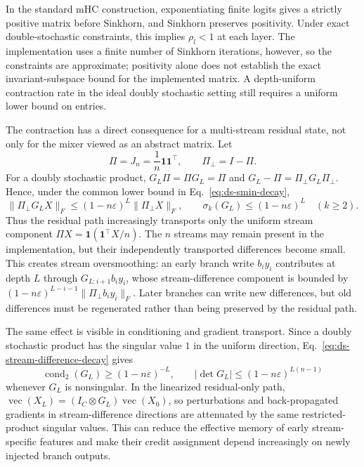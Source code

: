 \documentclass{article}
\begin{document}
In the standard mHC construction, exponentiating finite logits gives a strictly positive matrix before Sinkhorn, and Sinkhorn preserves positivity. Under exact double-stochastic constraints, this implies $\rho_l<1$ at each layer. The implementation uses a finite number of Sinkhorn iterations, however, so the constraints are approximate; positivity alone does not establish the exact invariant-subspace bound for the implemented matrix. A depth-uniform contraction rate in the ideal doubly stochastic setting still requires a uniform lower bound on entries.



The contraction has a direct consequence for a multi-stream residual state, not only for the mixer viewed as an abstract matrix. Let
\begin{equation}
 \Pi=J_n=\frac{1}{n}\mathbf 1\mathbf 1^\top,
 \qquad \Pi_\perp=I-\Pi.
 \label{eq:ds-projectors-main}
\end{equation}
For a doubly stochastic product, $G_L\Pi=\Pi G_L=\Pi$ and
$G_L-\Pi=\Pi_\perp G_L\Pi_\perp$. Hence, under the common lower bound in
Eq.~\ref{eq:ds-smin-decay},
\begin{equation}
 \|\Pi_\perp G_LX\|_F
 \leq (1-n\varepsilon)^L\|\Pi_\perp X\|_F,
 \qquad
 \sigma_k(G_L)\leq(1-n\varepsilon)^L\quad (k\geq2).
 \label{eq:ds-stream-difference-decay}
\end{equation}
Thus the residual path increasingly transports only the uniform stream component
$\Pi X=\mathbf 1(\mathbf 1^\top X/n)$. The $n$ streams may remain present in the
implementation, but their independently transported differences become small.
This creates stream oversmoothing: an early branch write $b_i y_i$ contributes at
depth $L$ through $G_{L:i+1}b_i y_i$, whose stream-difference component is bounded
by $(1-n\varepsilon)^{L-i-1}\|\Pi_\perp b_i y_i\|_F$. Later branches can write new
differences, but old differences must be regenerated rather than being preserved
by the residual path.

The same effect is visible in conditioning and gradient transport. Since a
doubly stochastic product has the singular value $1$ in the uniform direction,
Eq.~\ref{eq:ds-stream-difference-decay} gives
\begin{equation}
 \operatorname{cond}_2(G_L)\geq (1-n\varepsilon)^{-L},
 \qquad
 |\det G_L|\leq (1-n\varepsilon)^{L(n-1)}
 \label{eq:ds-conditioning}
\end{equation}
whenever $G_L$ is nonsingular. In the linearized residual-only path,
$\operatorname{vec}(X_L)=(I_C\otimes G_L)\operatorname{vec}(X_0)$, so
perturbations and back-propagated gradients in stream-difference directions are
attenuated by the same restricted-product singular values. This can reduce the
effective memory of early stream-specific features and make their credit
assignment depend increasingly on newly injected branch outputs.
\end{document}
